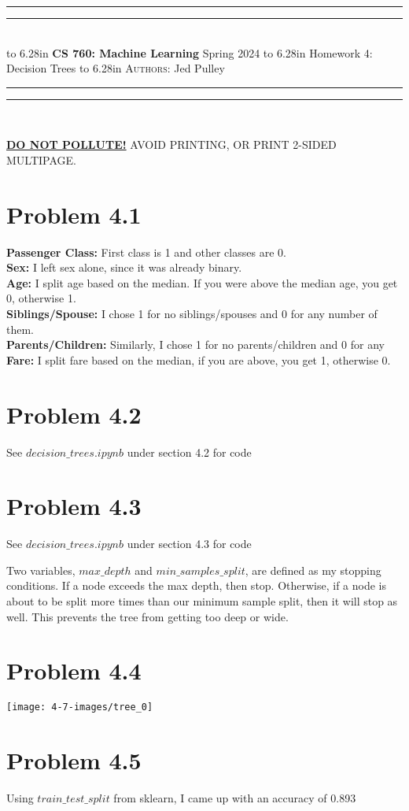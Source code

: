\documentclass{article}
\newcommand{\lecture}[2]{
\pagestyle{myheadings}
\thispagestyle{plain}
\newpage
\noindent
\begin{center}
\rule{\textwidth}{1.6pt}\vspace*{-\baselineskip}\vspace*{2pt} %
\rule{\textwidth}{0.4pt}\\[1\baselineskip] %
\vbox{\vspace{2mm}
\hbox to 6.28in { {\bf CS 760: Machine Learning} \hfill Spring 2024 }
\vspace{4mm}
\hbox to 6.28in { {\Large \hfill #1  \hfill} }
\vspace{4mm}
\hbox to 6.28in { {\scshape Authors:}  #2 \hfill }}
\vspace{-2mm}
\rule{\textwidth}{0.4pt}\vspace*{-\baselineskip}\vspace{3.2pt} %
\rule{\textwidth}{1.6pt}\\[\baselineskip] %
\end{center}
\vspace*{4mm}
}
\begin{document}
\lecture{Homework 4: Decision Trees}{Jed Pulley}

\begin{center}
{\Large {\sf \underline{\textbf{DO NOT POLLUTE!}} AVOID PRINTING, OR PRINT 2-SIDED MULTIPAGE.}}
\end{center}

\section*{Problem 4.1}
\textbf{Passenger Class:} First class is 1 and other classes are 0. \\
\textbf{Sex:} I left sex alone, since it was already binary. \\
\textbf{Age:} I split age based on the median. If you were above the median age, you get 0, otherwise 1. \\
\textbf{Siblings/Spouse:} I chose 1 for no siblings/spouses and 0 for any number of them. \\
\textbf{Parents/Children:} Similarly, I chose 1 for no parents/children and 0 for any \\
\textbf{Fare:} I split fare based on the median, if you are above, you get 1, otherwise 0.

\section*{Problem 4.2}
See $decision\_trees.ipynb$ under section 4.2 for code

\section*{Problem 4.3}
See $decision\_trees.ipynb$ under section 4.3 for code

Two variables, $max\_depth$ and $min\_samples\_split$, are defined as my  stopping conditions. If a node exceeds the max depth, then stop. Otherwise, if a node is about to be split more times than our minimum sample split, then it will stop as well. This prevents the tree from getting too deep or wide.

\section*{Problem 4.4}
\texttt{[image: 4-7-images/tree\_0]}

\section*{Problem 4.5}
Using $train\_test\_split$ from sklearn, I came up with an accuracy of 0.893
\end{document}
